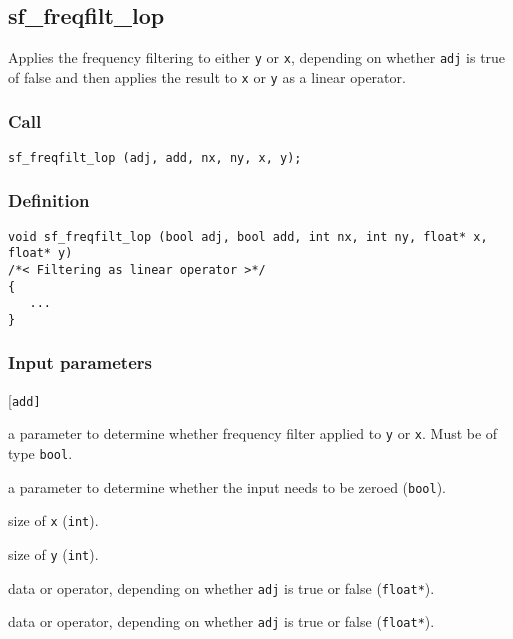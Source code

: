 \subsection{{sf\_freqfilt\_lop}}
Applies the frequency filtering to either \texttt{y} or \texttt{x}, depending on whether \texttt{adj} is true of false and then applies the result to \texttt{x} or \texttt{y} as a linear operator.

\subsubsection*{Call}
\begin{verbatim}sf_freqfilt_lop (adj, add, nx, ny, x, y);\end{verbatim}

\subsubsection*{Definition}
\begin{verbatim}
void sf_freqfilt_lop (bool adj, bool add, int nx, int ny, float* x, float* y) 
/*< Filtering as linear operator >*/
{
   ...
}
\end{verbatim}

\subsubsection*{Input parameters}
\begin{desclist}{\tt }{\quad}[\tt add]
   \setlength\itemsep{0pt}
   \item[adj] a parameter to determine whether frequency filter applied to \texttt{y} or \texttt{x}.  Must be of type \texttt{bool}.
   \item[add]  a parameter to determine whether the input needs to be zeroed (\texttt{bool}).
   \item[nx]   size of \texttt{x} (\texttt{int}).
   \item[ny]   size of \texttt{y} (\texttt{int}).
   \item[x]    data or operator, depending on whether \texttt{adj} is true or false (\texttt{float*}).
   \item[y]    data or operator, depending on whether \texttt{adj} is true or false (\texttt{float*}).
\end{desclist}

